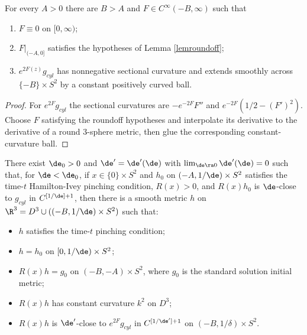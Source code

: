 \begin{lemma}
  \label{lem:kl-surgery-pinching-condition-positivity-ricci-flow-surgery}
 \label{capoff}
For every $A>0$ there are $B>A$ and $F\in C^\infty(-B,\infty)$ such that
\begin{enumerate}
\item $F\equiv0$ on $[0,\infty)$;
\item $F|_{(-A,0]}$ satisfies the hypotheses of Lemma \ref{lemroundoff};
\item $e^{2F(z)}g_{cyl}$ has nonnegative sectional curvature and extends
smoothly across $\{-B\}\times S^2$ by a constant positively curved ball.
\end{enumerate}
\end{lemma}
\begin{proof}
\sketch For $e^{2F}g_{cyl}$ the sectional curvatures are
$-e^{-2F}F''$ and $e^{-2F}(1/2-(F')^2)$. Choose $F$ satisfying the
roundoff hypotheses and interpolate its derivative to the derivative of a
round $3$-sphere metric, then glue the corresponding constant-curvature ball.
\end{proof}

\begin{lemma}
  \label{lem:kl-surgery-pinching-condition-existence-standard-solutions}
\label{preservingphipinching}
There exist $\de_0>0$ and $\de'=\de'(\de)$ with
$\lim_{\de\ra0}\de'(\de)=0$ such that, for $\de<\de_0$, if
$x\in\{0\}\times S^2$ and $h_0$ on $(-A,1/\de)\times S^2$ satisfies the
time-$t$ Hamilton-Ivey pinching condition, $R(x)>0$, and
$R(x)h_0$ is $\de$-close to $g_{cyl}$ in $C^{[1/\de]+1}$, then there is a
smooth metric $h$ on $\R^3=D^3\cup((-B,1/\de)\times S^2)$ such that:
\begin{itemize}
\item $h$ satisfies the time-$t$ pinching condition;
\item $h=h_0$ on $[0,1/\de)\times S^2$;
\item $R(x)h=g_0$ on $(-B,-A)\times S^2$, where $g_0$ is the standard
solution initial metric;
\item $R(x)h$ has constant curvature $k^2$ on $D^3$;
\item $R(x)h$ is $\de'$-close to $e^{2F}g_{cyl}$ in
$C^{[1/\de']+1}$ on $(-B,1/\delta)\times S^2$.
\end{itemize}
\end{lemma}


